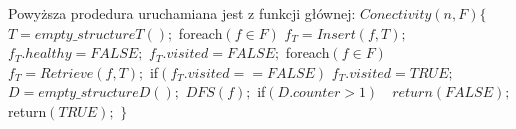 \documentclass{pracamgr}
\begin{document}
    \noindent
    Powyższa prodedura uruchamiana jest z funkcji głównej:\newline\newline
    \hspace*{100pt}$Conectivity(n,F)\{$\newline
    \hspace*{116pt}	$T=empty\_structureT();$\newline
    \hspace*{116pt}	foreach$(f\in F)$\newline
    \hspace*{132pt}		$f_T=Insert(f,T);$\newline
    \hspace*{132pt}		$f_T.healthy=FALSE;$\newline
    \hspace*{132pt}		$f_T.visited=FALSE;$\newline
    \hspace*{116pt}	foreach$(f\in F)$\newline
    \hspace*{132pt}		$f_T=Retrieve(f,T);$\newline
    \hspace*{132pt}		if$(f_T.visited==FALSE)$\newline
    \hspace*{148pt}			$f_T.visited=TRUE;$\newline
    \hspace*{148pt}			$D=empty\_structureD();$\newline
    \hspace*{148pt}			$DFS(f);$\newline
    \hspace*{148pt}			if$(D.counter>1)\quad return(FALSE);$\newline
    \hspace*{116pt}	return$(TRUE);$\newline
    \hspace*{100pt}$\}$\newline
\end{document}

